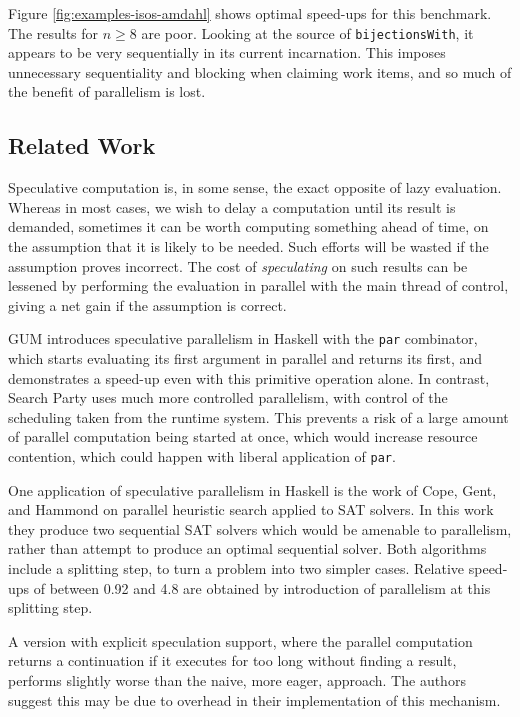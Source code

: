 Figure \ref{fig:examples-isos-amdahl} shows optimal speed-ups for this
benchmark. The results for $n \geq 8$ are poor. Looking at the source
of \verb|bijectionsWith|, it appears to be very sequentially in its
current incarnation. This imposes unnecessary sequentiality and
blocking when claiming work items, and so much of the benefit of
parallelism is lost.

\subsection{Related Work}
\label{sec:prelims-searchparty-related}

Speculative computation\cite{spec} is, in some sense, the exact
opposite of lazy evaluation. Whereas in most cases, we wish to delay a
computation until its result is demanded, sometimes it can be worth
computing something ahead of time, on the assumption that it is likely
to be needed. Such efforts will be wasted if the assumption proves
incorrect. The cost of \textit{speculating} on such results can be
lessened by performing the evaluation in parallel with the main thread
of control, giving a net gain if the assumption is correct.

GUM\cite{gum} introduces speculative parallelism in Haskell with the
\verb|par| combinator, which starts evaluating its first argument in
parallel and returns its first, and demonstrates a speed-up even with
this primitive operation alone. In contrast, Search Party uses much
more controlled parallelism, with control of the scheduling taken from
the runtime system. This prevents a risk of a large amount of parallel
computation being started at once, which would increase resource
contention, which could happen with liberal application of \verb|par|.

One application of speculative parallelism in Haskell is the work of
Cope, Gent, and Hammond on parallel heuristic search\cite{parsat}
applied to SAT solvers. In this work they produce two sequential SAT
solvers which would be amenable to parallelism, rather than attempt to
produce an optimal sequential solver. Both algorithms include a
splitting step, to turn a problem into two simpler cases. Relative
speed-ups of between 0.92 and 4.8 are obtained by introduction of
parallelism at this splitting step.

A version with explicit speculation support, where the parallel
computation returns a continuation if it executes for too long without
finding a result, performs slightly worse than the naive, more eager,
approach. The authors suggest this may be due to overhead in their
implementation of this mechanism.

